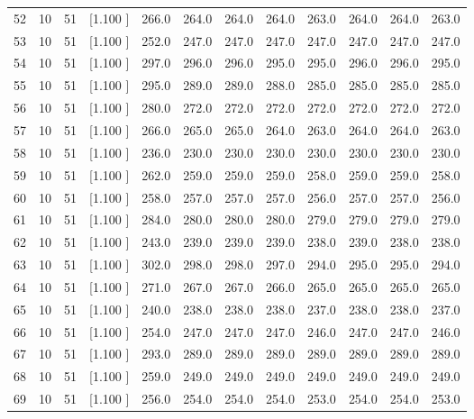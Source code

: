 \documentclass[12pt,a4paper]{article}
\begin{document}
\begin{center}
{\begin{tabular}{r r r r r r r r r r r r}
  52& 10& 51&[1.100     ]&   266.0&   264.0&   264.0&   264.0&   263.0&   264.0&   264.0&   263.0\\[-0.02in]
  53& 10& 51&[1.100     ]&   252.0&   247.0&   247.0&   247.0&   247.0&   247.0&   247.0&   247.0\\[-0.02in]
  54& 10& 51&[1.100     ]&   297.0&   296.0&   296.0&   295.0&   295.0&   296.0&   296.0&   295.0\\[-0.02in]
  55& 10& 51&[1.100     ]&   295.0&   289.0&   289.0&   288.0&   285.0&   285.0&   285.0&   285.0\\[-0.02in]
  56& 10& 51&[1.100     ]&   280.0&   272.0&   272.0&   272.0&   272.0&   272.0&   272.0&   272.0\\[-0.02in]
  57& 10& 51&[1.100     ]&   266.0&   265.0&   265.0&   264.0&   263.0&   264.0&   264.0&   263.0\\[-0.02in]
  58& 10& 51&[1.100     ]&   236.0&   230.0&   230.0&   230.0&   230.0&   230.0&   230.0&   230.0\\[-0.02in]
  59& 10& 51&[1.100     ]&   262.0&   259.0&   259.0&   259.0&   258.0&   259.0&   259.0&   258.0\\[-0.02in]
  60& 10& 51&[1.100     ]&   258.0&   257.0&   257.0&   257.0&   256.0&   257.0&   257.0&   256.0\\[-0.02in]
  61& 10& 51&[1.100     ]&   284.0&   280.0&   280.0&   280.0&   279.0&   279.0&   279.0&   279.0\\[-0.02in]
  62& 10& 51&[1.100     ]&   243.0&   239.0&   239.0&   239.0&   238.0&   239.0&   238.0&   238.0\\[-0.02in]
  63& 10& 51&[1.100     ]&   302.0&   298.0&   298.0&   297.0&   294.0&   295.0&   295.0&   294.0\\[-0.02in]
  64& 10& 51&[1.100     ]&   271.0&   267.0&   267.0&   266.0&   265.0&   265.0&   265.0&   265.0\\[-0.02in]
  65& 10& 51&[1.100     ]&   240.0&   238.0&   238.0&   238.0&   237.0&   238.0&   238.0&   237.0\\[-0.02in]
  66& 10& 51&[1.100     ]&   254.0&   247.0&   247.0&   247.0&   246.0&   247.0&   247.0&   246.0\\[-0.02in]
  67& 10& 51&[1.100     ]&   293.0&   289.0&   289.0&   289.0&   289.0&   289.0&   289.0&   289.0\\[-0.02in]
  68& 10& 51&[1.100     ]&   259.0&   249.0&   249.0&   249.0&   249.0&   249.0&   249.0&   249.0\\[-0.02in]
  69& 10& 51&[1.100     ]&   256.0&   254.0&   254.0&   254.0&   253.0&   254.0&   254.0&   253.0\\[-0.02in]

\end{tabular}}
\end{center}
\end{document}

